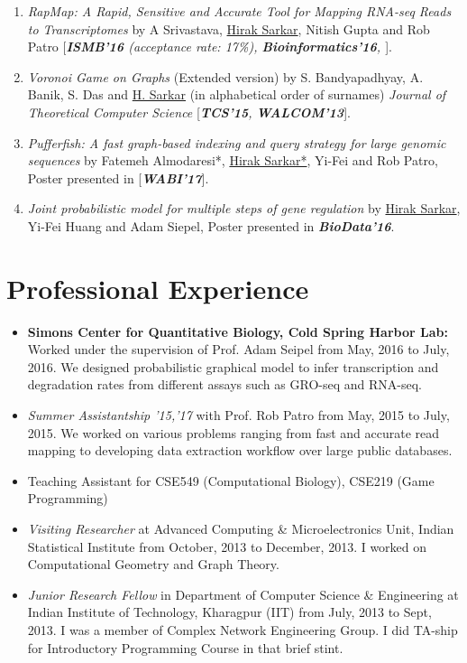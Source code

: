 \documentclass{res}
\begin{document}
\begin{resume}
\begin{enumerate}
\item {\it RapMap: A Rapid, Sensitive and Accurate Tool for Mapping RNA-seq Reads to Transcriptomes} by A Srivastava, \underline{Hirak Sarkar}, Nitish Gupta and Rob Patro  [\textit{\textbf{ISMB'16} (acceptance rate: 17\%), \textbf {Bioinformatics'16}, \href{https://doi.org/10.1101/029652}{\color{blue}{arXiv'16}}}].

\item {\it Voronoi Game on Graphs} (Extended version) by S. Bandyapadhyay, A. Banik, S. Das and \underline{H. Sarkar} (in alphabetical order of surnames) {\it Journal of Theoretical Computer Science}  [\textit{\textbf{TCS'15}, \textbf{WALCOM'13}}].

\item {\it Pufferfish: A fast graph-based indexing and query strategy for large genomic sequences} by Fatemeh Almodaresi*, \underline{Hirak Sarkar*}, Yi-Fei and Rob Patro, Poster presented in [\textit{\textbf{WABI'17}}].

\item {\it Joint probabilistic model for multiple steps of gene regulation} by \underline{Hirak Sarkar}, Yi-Fei Huang and Adam Siepel, Poster presented in  \textit{\textbf{BioData'16}}.

\vspace{-0.5cm}
\end{enumerate}

\section{Professional Experience}
\vspace{-0.5cm}
\begin{itemize}
\item {\textbf {Simons Center for Quantitative Biology, Cold Spring Harbor Lab:}} Worked under the supervision of Prof. Adam Seipel from May, 2016 to July, 2016. We designed probabilistic graphical model to infer transcription and degradation rates from different assays such as GRO-seq and RNA-seq.  
\item {\it Summer Assistantship '15,'17} with Prof. Rob Patro from May, 2015 to July, 2015. We worked on various problems ranging from fast and accurate read mapping to developing data extraction workflow over large public databases.  
\item  Teaching Assistant for CSE549 (Computational Biology), CSE219 (Game Programming)
\item {\it Visiting Researcher} at Advanced Computing \& Microelectronics Unit, Indian Statistical Institute from October, 2013 to December, 
2013. I worked on Computational Geometry and Graph Theory.
\item {\it Junior Research Fellow} in Department of Computer Science \& Engineering at Indian Institute of Technology, Kharagpur (IIT) 
from July, 2013 to Sept, 2013. I was a member of Complex Network Engineering Group. I did TA-ship for Introductory Programming 
Course in that brief stint. 
\end{itemize}


\end{resume}
\end{document}
